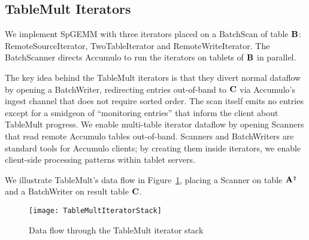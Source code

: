 \subsection{TableMult Iterators}
\label{sTableMult}

We implement SpGEMM with three iterators placed on a BatchScan of table $\mathbf{B}$:
RemoteSourceIterator, TwoTableIterator and RemoteWriteIterator.
The BatchScanner directs Accumulo to run the iterators on tablets of $\mathbf{B}$ in parallel.

The key idea behind the TableMult iterators is that they divert normal dataflow by opening a BatchWriter,
redirecting entries out-of-band to $\mathbf{C}$ via
Accumulo's ingest channel that does not require sorted order. 
The scan itself emits no entries except for a smidgeon of ``monitoring entries'' 
that inform the client about TableMult progress.
We enable multi-table iterator dataflow by opening Scanners 
that read remote Accumulo tables out-of-band.
Scanners and BatchWriters are standard tools for Accumulo clients; 
by creating them inside iterators, we enable client-side processing patterns
within tablet servers.

We illustrate TableMult's data flow in Figure~\ref{fIteratorStackSpGEMM},
placing a Scanner on table $\mathbf{A^{\intercal}}$
and a BatchWriter on result table $\mathbf{C}$.

\begin{figure}[htb]
\vspace{-3pt}
\centering
\texttt{[image: TableMultIteratorStack]}
\vspace{-8pt}
\caption{Data flow through the TableMult iterator stack}
\label{fIteratorStackSpGEMM}
\vspace{-9pt}
\end{figure}


